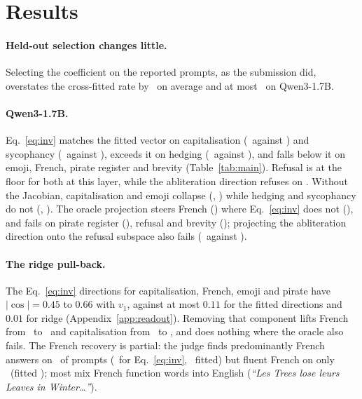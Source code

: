 \documentclass{article}
\begin{document}
\section{Results}
\label{sec:results}

\paragraph{Held-out selection changes little.} Selecting the coefficient on the reported prompts, as the submission did, overstates the cross-fitted rate by \INFLMEAN\ on average and at most \INFLMAX\ on Qwen3-1.7B.

\paragraph{Qwen3-1.7B.} Eq.~\ref{eq:inv} matches the fitted vector on capitalisation (\CAPSOURS\ against \CAPSFITTED) and sycophancy (\SYCOOURS\ against \SYCOFITTED), exceeds it on hedging (\HEDGEOURS\ against \HEDGEFITTED), and falls below it on emoji, French, pirate register and brevity (Table~\ref{tab:main}). Refusal is at the floor for both at this layer, while the abliteration direction refuses on \ABLRATE. Without the Jacobian, capitalisation and emoji collapse (\CAPSEYE, \EMOJIEYE) while hedging and sycophancy do not (\HEDGEEYE, \SYCOEYE). The oracle projection steers French (\FRENCHORACLE) where Eq.~\ref{eq:inv} does not (\FRENCHOURS), and fails on pirate register (\PIRATEORACLE), refusal and brevity (\BRIEFORACLE); projecting the abliteration direction onto the refusal subspace also fails (\ABLORACLE\ against \ABLRATE).

\paragraph{The ridge pull-back.} The Eq.~\ref{eq:inv} directions for capitalisation, French, emoji and pirate have $|\cos| = 0.45$ to $0.66$ with $v_1$, against at most $0.11$ for the fitted directions and $0.01$ for ridge (Appendix~\ref{app:readout}). Removing that component lifts French from \FRENCHOURS\ to \FRENCHRIDGE\ and capitalisation from \CAPSOURS\ to \CAPSRIDGE, and does nothing where the oracle also fails. The French recovery is partial: the judge finds predominantly French answers on \JFRRIDGE\ of prompts (\JFROURS\ for Eq.~\ref{eq:inv}, \JFRFITTED\ fitted) but fluent French on only \JFRFLUENTRIDGE\ (fitted \JFRFLUENTFITTED); most mix French function words into English (\emph{``Les Trees lose leurs Leaves in Winter\ldots''}).
\end{document}
